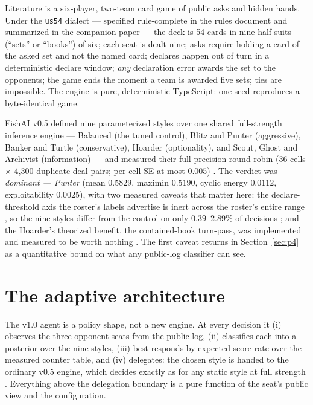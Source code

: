 \documentclass[11pt]{article}
\newcommand{\code}[1]{\texttt{#1}}
\newcommand{\usff}{\code{us54}}
\begin{document}
Literature is a six-player, two-team card game of public asks and hidden hands. Under the
\usff{} dialect --- specified rule-complete in the rules document \cite{rules} and
summarized in the companion paper \cite{v05paper} --- the deck is 54 cards in nine
half-suits (``sets'' or ``books'') of six; each seat is dealt nine; asks require holding a
card of the asked set and not the named card; declares happen out of turn in a
deterministic declare window; \emph{any} declaration error awards the set to the
opponents; the game ends the moment a team is awarded five sets; ties are impossible. The
engine is pure, deterministic TypeScript: one seed reproduces a byte-identical game.

FishAI v0.5 \cite{v05paper} defined nine parameterized styles over one shared
full-strength inference engine --- Balanced (the tuned control), Blitz and Punter
(aggressive), Banker and Turtle (conservative), Hoarder (optionality), and Scout, Ghost
and Archivist (information) --- and measured their full-precision round robin (36 cells
$\times$ 4{,}300 duplicate deal pairs; per-cell SE at most $0.005$) \cite{matrixv2}. The
verdict was \emph{dominant --- Punter} (mean $0.5829$,
maximin $0.5190$, cyclic energy $0.0112$, exploitability $0.0025$), with two measured
caveats that matter here: the declare-threshold axis the roster's labels advertise is
inert across the roster's entire range \cite{inertpaper}, so the nine styles differ from
the control on only $0.39$--$2.89\%$ of decisions \cite{styles}; and the Hoarder's
theorized benefit, the contained-book turn-pass, was implemented and measured to be worth
nothing \cite{containedpaper}. The first caveat returns in Section~\ref{sec:p4} as a
quantitative bound on what any public-log classifier can see.

\section{The adaptive architecture}
\label{sec:arch}

The v1.0 agent is a policy shape, not a new engine. At every decision it (i) observes the
three opponent seats from the public log, (ii) classifies each into a posterior over the
nine styles, (iii) best-responds by expected score rate over the measured counter table,
and (iv) delegates: the chosen style is handed to the ordinary v0.5 engine, which decides
exactly as for any static style at full strength \cite{repo}. Everything above the
delegation boundary is a pure function of the seat's public view and the configuration.
\end{document}
